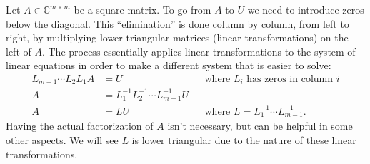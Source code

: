 \documentclass[12pt,letterpaper,DIV=11]{scrartcl}
\theoremstyle{plain}
\theoremstyle{definition}
\theoremstyle{remark}
\begin{document}
Let $A \in \mathbb{C}^{m \times m}$ be a square matrix.
To go from $A$ to $U$ we need to introduce zeros below the diagonal.
This \enquote{elimination} is done column by column, from left to right, by multiplying lower triangular matrices (linear transformations) on the left of $A$.
The process essentially applies linear transformations to the system of linear equations in order to make a different system that is easier to solve: \begin{align*}
  L_{m - 1} \cdots L_2 L_1 A &= U && \text{where $L_i$ has zeros in column $i$} \\
  A &= L_1^{-1} L_2^{-1} \cdots L_{m - 1}^{-1} U \\
  A &= LU && \text{where $L = L_1^{-1} \cdots L_{m - 1}^{-1}$}.
\end{align*}
Having the actual factorization of $A$ isn't necessary, but can be helpful in some other aspects.
We will see $L$ is lower triangular due to the nature of these linear transformations.
\end{document}
